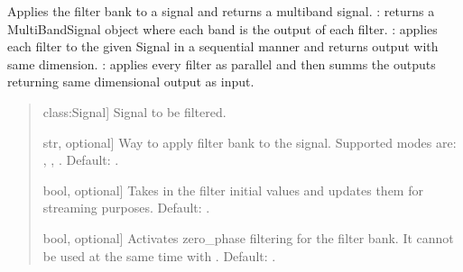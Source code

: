 \documentclass[letterpaper,10pt,english]{sphinxmanual}
\begin{document}
\begin{fulllineitems}
\begin{fulllineitems}
\label{\detokenize{classes:dsptools.classes.filterbank.FilterBank.filter_signal}}
\pysigstartsignatures
{}
\pysigstopsignatures
\sphinxAtStartPar
Applies the filter bank to a signal and returns a multiband signal.
: returns a MultiBandSignal object where each band is
the output of each filter.
: applies each filter to the given Signal in a sequential
manner and returns output with same dimension.
: applies every filter as parallel and then summs the outputs
returning same dimensional output as input.
\begin{quote}\begin{description}
\begin{description}
\sphinxlineitem{\sphinxstylestrong{signal}}{[}class:Signal{]}
\sphinxAtStartPar
Signal to be filtered.

\sphinxlineitem{\sphinxstylestrong{mode}}{[}str, optional{]}
\sphinxAtStartPar
Way to apply filter bank to the signal. Supported modes are:
, , . Default: .

\sphinxlineitem{\sphinxstylestrong{activate\_zi}}{[}bool, optional{]}
\sphinxAtStartPar
Takes in the filter initial values and updates them for
streaming purposes. Default: .

\sphinxlineitem{\sphinxstylestrong{zero\_phase}}{[}bool, optional{]}
\sphinxAtStartPar
Activates zero\_phase filtering for the filter bank. It cannot be
used at the same time with . Default: .


\end{description}
\end{description}
\end{quote}
\end{fulllineitems}
\end{fulllineitems}
\end{document}
